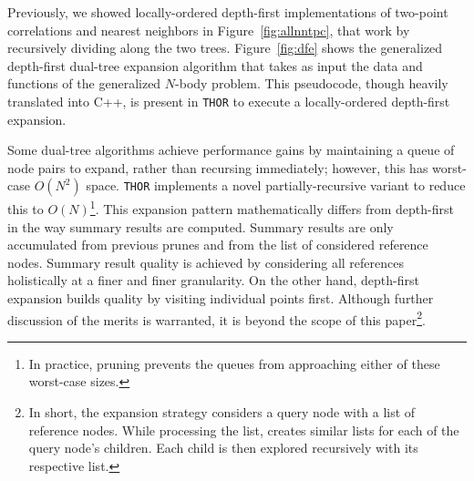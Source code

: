 \documentclass[twoside,leqno,twocolumn]{article}
\newcommand{\THOR}{{{\tt THOR}} }
\newcommand{\fig}[1]{Figure~\ref{fig:#1}}
\begin{document}
Previously, we showed locally-ordered depth-first implementations of two-point correlations and nearest neighbors in \fig{allnntpc}, that work by recursively dividing along the two trees.
\fig{dfe} shows the generalized depth-first dual-tree expansion algorithm that takes as input the data and functions of the generalized $N$-body problem.
This pseudocode, though heavily translated into C++, is present in \THOR to execute a locally-ordered depth-first expansion.

Some dual-tree algorithms achieve performance gains by maintaining a queue of node pairs to expand, rather than recursing immediately; however, this has worst-case $O(N^2)$ space.
\THOR implements a novel partially-recursive variant to reduce this to $O(N)$\footnote{
  In practice, pruning prevents the queues from approaching either of these worst-case sizes.}.
This expansion pattern mathematically differs from depth-first in the way summary results are computed.
Summary results are only accumulated from previous prunes and from the list of considered reference nodes.
Summary result quality is achieved by considering all references holistically at a finer and finer granularity.
On the other hand, depth-first expansion builds quality by visiting individual points first.
Although further discussion of the merits is warranted, it is beyond the scope of this paper\footnote{
  In short, the expansion strategy considers a query node with a list of reference nodes.
  While processing the list, creates similar lists for each of the query node's children.
  Each child is then explored recursively with its respective list.}.
\end{document}
